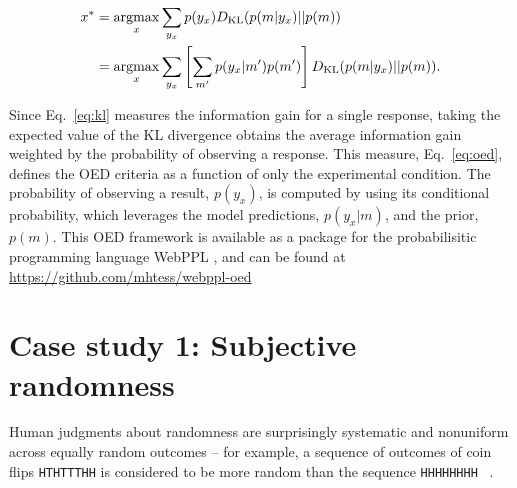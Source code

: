\documentclass{article}
\newcommand{\ndg}[1]{\textcolor{Green}{[ndg: #1]}}
\newcommand{\argmax}{\operatornamewithlimits{argmax}}
\begin{document}
\begin{align}
x^{*} &= \argmax_{x} \sum\limits_{y_x} p(y_x) D_{\text{KL}}(p(m|y_x) || p(m)) \notag \\
    &= \argmax_{x} \sum\limits_{y_x} \left[\sum\limits_{m'} p(y_x|m')p(m')\right] D_{\text{KL}}(p(m|y_x) || p(m)). \label{eq:oed}
\end{align}

Since Eq.~\ref{eq:kl} measures the information gain for a single response, taking the expected value of the KL divergence obtains the average information gain weighted by the probability of observing a response. This measure, Eq.~\ref{eq:oed}, defines the OED criteria as a function of only the experimental condition. The probability of observing a result, $p(y_x)$, is computed by using its conditional probability, which leverages the model predictions, $p(y_x|m)$, and the prior, $p(m)$.
This OED framework is available as a package for the probabilisitic programming language WebPPL \cite{dippl}, and can be found at \url{https://github.com/mhtess/webppl-oed}

\section{Case study 1: Subjective randomness}
\label{s:tutorial}

Human judgments about randomness are surprisingly systematic and nonuniform across equally random outcomes -- for example, a sequence of outcomes of coin flips \lstinline{HTHTTTHH} is considered to be more random than the sequence \lstinline{HHHHHHHH} ~\cite{goodfellow38:jep, griffiths01:cogsci}.
\end{document}
